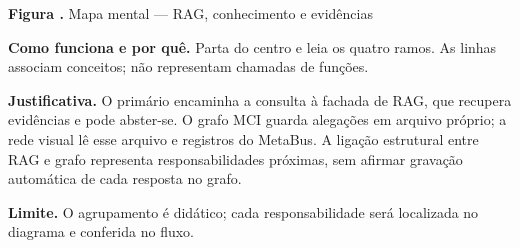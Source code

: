 {\small\textbf{Figura \thefigure.} Mapa mental --- RAG, conhecimento e evidências}\par\smallskip
\noindent\textbf{Como funciona e por quê.} Parta do centro e leia os quatro ramos. As linhas associam conceitos; não representam chamadas de funções.\par
\noindent\textbf{Justificativa.} O primário encaminha a consulta à fachada de RAG, que recupera evidências e pode abster-se. O grafo MCI guarda alegações em arquivo próprio; a rede visual lê esse arquivo e registros do MetaBus. A ligação estrutural entre RAG e grafo representa responsabilidades próximas, sem afirmar gravação automática de cada resposta no grafo.\par
\noindent\textbf{Limite.} O agrupamento é didático; cada responsabilidade será localizada no diagrama e conferida no fluxo.\par\smallskip
{}
